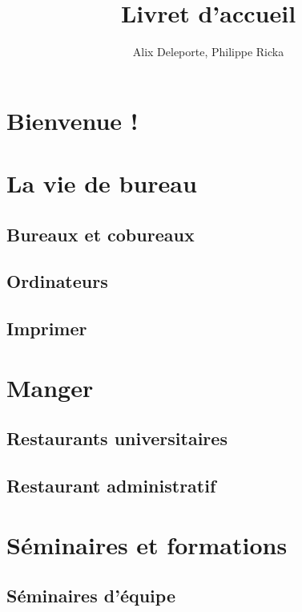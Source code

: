 \documentclass[a5paper]{article}
\title{Livret d'accueil}
\author{Alix Deleporte, Philippe Ricka}
\date{}
\begin{document}
\maketitle

\tableofcontents

\section{Bienvenue !}
\label{sec:bienvenue-}

\section{La vie de bureau}
\label{sec:la-vie-de}

\subsection{Bureaux et cobureaux}
\label{sec:bureaux-et-cobureaux}

\subsection{Ordinateurs}
\label{sec:ordinateurs}

\subsection{Imprimer}
\label{sec:imprimer}

\section{Manger}
\label{sec:manger}

\subsection{Restaurants universitaires}
\label{sec:rest-univ}

\subsection{Restaurant administratif}
\label{sec:rest-admin}

\section{Séminaires et formations}
\label{sec:seminaires-et}

\subsection{Séminaires d'équipe}
\label{sec:seminaires-dequipe}
\end{document}
